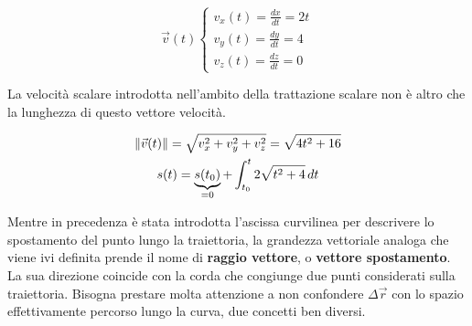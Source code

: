 \[
	\vec{v}(t)
		\begin{cases}
			v_x(t)=\frac{dx}{dt}=2t \\
			v_y(t)=\frac{dy}{dt}=4 \\
			v_z(t)=\frac{dz}{dt}=0
		\end{cases}
\]

La velocità scalare introdotta nell'ambito della trattazione scalare non è altro che la lunghezza di questo vettore velocità.

\begin{gather*}
	\lVert\vec{v}(t)\rVert=\sqrt{v_x^2+v_y^2+v_z^2}=\sqrt{4t^2+16} \\
	s(t)=\underbrace{s(t_0)}_{=0}+\int^t_{t_0} 2\sqrt{t^2+4}\,dt
\end{gather*}

Mentre in precedenza è stata introdotta l'ascissa curvilinea per descrivere lo spostamento del punto lungo la traiettoria, la grandezza vettoriale analoga che viene ivi definita prende il nome di \textbf{raggio vettore}, o \textbf{vettore spostamento}. La sua direzione coincide con la corda che congiunge due punti considerati sulla traiettoria. Bisogna prestare molta attenzione a non confondere $\Delta\vec{r}$ con lo spazio effettivamente percorso lungo la curva, due concetti ben diversi.

